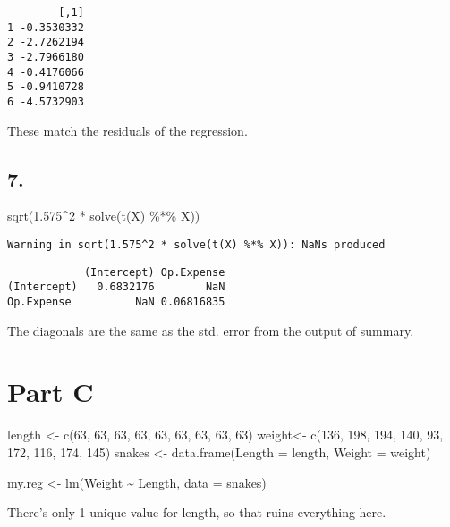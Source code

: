 \documentclass[
  letterpaper,
  DIV=11,
  numbers=noendperiod]{scrartcl}
\newenvironment{Shaded}{\begin{snugshade}}{\end{snugshade}}
\newcommand{\AttributeTok}[1]{\textcolor[rgb]{0.40,0.45,0.13}{#1}}
\newcommand{\DecValTok}[1]{\textcolor[rgb]{0.68,0.00,0.00}{#1}}
\newcommand{\FloatTok}[1]{\textcolor[rgb]{0.68,0.00,0.00}{#1}}
\newcommand{\FunctionTok}[1]{\textcolor[rgb]{0.28,0.35,0.67}{#1}}
\newcommand{\NormalTok}[1]{\textcolor[rgb]{0.00,0.23,0.31}{#1}}
\newcommand{\OtherTok}[1]{\textcolor[rgb]{0.00,0.23,0.31}{#1}}
\newcommand{\SpecialCharTok}[1]{\textcolor[rgb]{0.37,0.37,0.37}{#1}}
\begin{document}
\begin{verbatim}
        [,1]
1 -0.3530332
2 -2.7262194
3 -2.7966180
4 -0.4176066
5 -0.9410728
6 -4.5732903
\end{verbatim}

These match the residuals of the regression.

\hypertarget{section-9}{%
\subsection{7.}\label{section-9}}

\begin{Shaded}
\begin{Highlighting}[]
\FunctionTok{sqrt}\NormalTok{(}\FloatTok{1.575}\SpecialCharTok{\^{}}\DecValTok{2} \SpecialCharTok{*} \FunctionTok{solve}\NormalTok{(}\FunctionTok{t}\NormalTok{(X) }\SpecialCharTok{\%*\%}\NormalTok{ X))}
\end{Highlighting}
\end{Shaded}

\begin{verbatim}
Warning in sqrt(1.575^2 * solve(t(X) %*% X)): NaNs produced
\end{verbatim}

\begin{verbatim}
            (Intercept) Op.Expense
(Intercept)   0.6832176        NaN
Op.Expense          NaN 0.06816835
\end{verbatim}

The diagonals are the same as the std. error from the output of summary.

\hypertarget{part-c}{%
\section{Part C}\label{part-c}}

\begin{Shaded}
\begin{Highlighting}[]
\NormalTok{length }\OtherTok{\textless{}{-}} \FunctionTok{c}\NormalTok{(}\DecValTok{63}\NormalTok{, }\DecValTok{63}\NormalTok{, }\DecValTok{63}\NormalTok{, }\DecValTok{63}\NormalTok{, }\DecValTok{63}\NormalTok{, }\DecValTok{63}\NormalTok{, }\DecValTok{63}\NormalTok{, }\DecValTok{63}\NormalTok{, }\DecValTok{63}\NormalTok{)}
\NormalTok{weight}\OtherTok{\textless{}{-}} \FunctionTok{c}\NormalTok{(}\DecValTok{136}\NormalTok{, }\DecValTok{198}\NormalTok{, }\DecValTok{194}\NormalTok{, }\DecValTok{140}\NormalTok{, }\DecValTok{93}\NormalTok{, }\DecValTok{172}\NormalTok{, }\DecValTok{116}\NormalTok{, }\DecValTok{174}\NormalTok{, }\DecValTok{145}\NormalTok{)}
\NormalTok{snakes }\OtherTok{\textless{}{-}} \FunctionTok{data.frame}\NormalTok{(}\AttributeTok{Length =}\NormalTok{ length, }\AttributeTok{Weight =}\NormalTok{ weight)}

\NormalTok{my.reg }\OtherTok{\textless{}{-}} \FunctionTok{lm}\NormalTok{(Weight }\SpecialCharTok{\textasciitilde{}}\NormalTok{ Length, }\AttributeTok{data =}\NormalTok{ snakes)}
\end{Highlighting}
\end{Shaded}

There's only 1 unique value for length, so that ruins everything here.
\end{document}
